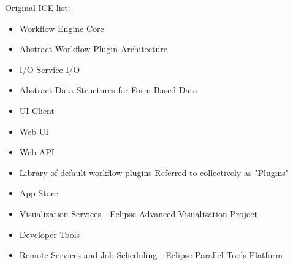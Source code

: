 Original ICE list:
\begin{itemize}
\item Workflow Engine	Core
\item Abstract Workflow Plugin Architecture
\item I/O Service	I/O	
\item Abstract Data Structures for Form-Based Data
\item UI Client	
\item Web UI
\item Web API
\item Library of default workflow plugins	Referred to collectively as "Plugins"	
\item App Store
\item Visualization Services - Eclipse Advanced Visualization Project
\item Developer Tools
\item Remote Services and Job Scheduling - Eclipse Parallel Tools Platform
\end{itemize}